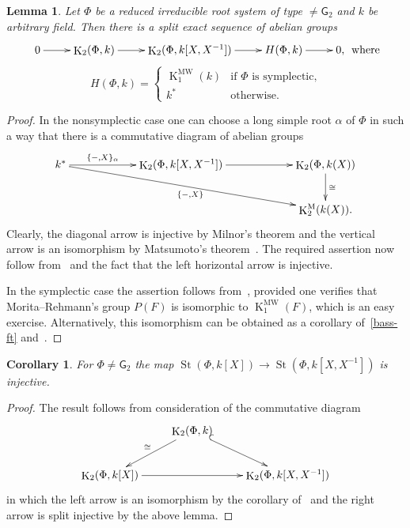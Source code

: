 \documentclass[oneside, 10pt]{amsart}
\newtheorem{corollary}{Corollary}
\newtheorem{lemma}{Lemma}
\theoremstyle{remark}
\theoremstyle{definition}
\DeclareMathOperator{\St}{St}
\DeclareMathOperator{\K}{K}
\newcommand{\rG}{\mathsf{G}}
\numberwithin{equation}{section}
\begin{document}
\begin{lemma} Let $\Phi$ be a reduced irreducible root system of type $\neq \rG_2$ and $k$ be arbitrary field.
Then there is a split exact sequence of abelian groups
\[ \xymatrix{ 0 \ar[r] & \K_2(\Phi, k) \ar[r] & \K_2(\Phi, k[X, X^{-1}]) \ar[r] & H(\Phi, k) \ar[r] & 0,}\text{ where} \]
\[ H(\Phi, k) = \left\{\begin{array}{ll} \K_1^\mathrm{MW}(k)& \text{if $\Phi$ is symplectic,}\\ k^* & \text{otherwise.}  \end{array}\right. \]  \end{lemma}
\begin{proof} In the nonsymplectic case one can choose a long simple root $\alpha$ of $\Phi$ in such a way that there is a commutative diagram of abelian groups
\[\xymatrixcolsep{5pc}\xymatrix{k^* \ar[r]^-{\{ -, X \}_{\alpha}} \ar[rrd]_{\{-, X\}} & \K_2(\Phi, k[X, X^{-1}]) \ar[r] & \K_2(\Phi, k(X)) \ar[d]^{\cong} \\
                                                                                      &                                 & \K_2^\mathrm{M}(k(X)).} \]
Clearly, the diagonal arrow is injective by Milnor's theorem and the vertical arrow is an isomorphism by Matsumoto's theorem~\cite[Theorem~5.10]{Ma69}.
The required assertion now follow from~\cite[Satz~3]{Hur77} and the fact that the left horizontal arrow is injective.

In the symplectic case the assertion follows from~\cite[Theorem~B]{MR91}, provided one verifies that Morita--Rehmann's group $P(F)$ is isomorphic to $\K_1^\mathrm{MW}(F)$,
 which is an easy exercise. Alternatively, this isomorphism can be obtained as a corollary of~\cref{bass-ft} and~\cite[Lemma~4.1.1]{AF17}. \end{proof}
 
\begin{corollary} \label{field-injectivity} For $\Phi\neq\rG_2$ the map $\St(\Phi, k[X]) \to \St(\Phi, k[X, X^{-1}])$ is injective. \end{corollary}
\begin{proof} The result follows from consideration of the commutative diagram
\[\xymatrix{ & \K_2(\Phi, k) \ar[dl]_{\cong} \ar@{^{(}->}[dr] & \\
               \K_2(\Phi, k[X]) \ar[rr] &               & \K_2(\Phi, k[X, X^{-1}])} \]
in which the left arrow is an isomorphism by the corollary of~\cite[Satz~1]{Re75} and the right arrow is split injective by the above lemma. \end{proof}
\end{document}
